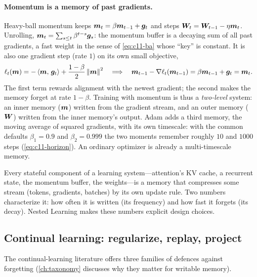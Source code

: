 \paragraph{Momentum is a memory of past gradients.} Heavy-ball momentum keeps
$\bm{m}_t = \beta\bm{m}_{t-1} + \bm{g}_t$ and steps $\bm{W}_t = \bm{W}_{t-1} - \eta\bm{m}_t$. Unrolling,
$\bm{m}_t = \sum_{s\le t}\beta^{t-s}\bm{g}_s$: the momentum buffer is a decaying sum of all past
gradients, a fast weight in the sense of \cref{eq:c11-ba} whose ``key'' is constant. It is also
one gradient step (rate $1$) on its own small objective,
\begin{equation}
  \ell_t(\bm{m}) = -\left\langle \bm{m},\, \bm{g}_t\right\rangle + \frac{1-\beta}{2}\left\lVert \bm{m}\right\rVert^2
  \quad\Longrightarrow\quad
  \bm{m}_{t-1} - \nabla\ell_t(\bm{m}_{t-1}) = \beta\bm{m}_{t-1} + \bm{g}_t = \bm{m}_t .
  \label{eq:c11-momentum-obj}
\end{equation}
The first term rewards alignment with the newest gradient; the second makes the memory forget at
rate $1-\beta$. Training with momentum is thus a \emph{two-level} system: an inner memory
($\bm{m}$) written from the gradient stream, and an outer memory ($\bm{W}$) written from the inner
memory's output. Adam \citep{c01-kingma2015adam} adds a third memory, the moving average of
squared gradients, with its own timescale: with the common defaults $\beta_1 = 0.9$ and
$\beta_2 = 0.999$ the two moments remember roughly $10$ and $1000$ steps
(\cref{eq:c11-horizon}). An ordinary optimizer is already a multi-timescale memory.

\begin{keyidea}
Every stateful component of a learning system---attention's KV cache, a recurrent state, the
momentum buffer, the weights---is a memory that compresses some stream (tokens, gradients,
batches) by its own update rule. Two numbers characterize it: how often it is written (its
frequency) and how fast it forgets (its decay). Nested Learning makes these numbers explicit
design choices.
\end{keyidea}

\subsection{Continual learning: regularize, replay, project}\label{sec:c11-cl}

The continual-learning literature offers three families of defences against forgetting
(\cref{ch:taxonomy} discusses why they matter for writable memory).

